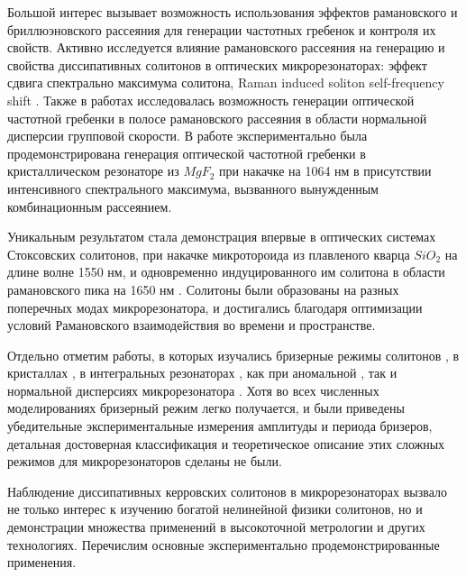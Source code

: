 Большой интерес вызывает возможность использования эффектов рамановского и бриллюэновского рассеяния для генерации частотных гребенок и контроля их свойств. Активно исследуется влияние рамановского рассеяния на генерацию и свойства диссипативных солитонов в оптических микрорезонаторах: эффект сдвига спектрально максимума солитона, Raman induced soliton self-frequency shift \cite{Hansson2014ol,Milian2015,Yi2016,Karpov2016,Bao2017}. Также в работах \cite{Chembo2015,Chembo2016} исследовалась возможность генерации оптической частотной гребенки в полосе рамановского рассеяния в области нормальной дисперсии групповой скорости. В работе \cite{Chembo2015} экспериментально была продемонстрирована генерация оптической частотной гребенки в кристаллическом резонаторе из $MgF_2$ при накачке на 1064 нм в присутствии интенсивного спектрального максимума, вызванного вынужденным комбинационным рассеянием.

Уникальным результатом стала демонстрация впервые в оптических системах Стоксовских солитонов, при накачке микротороида из плавленого кварца $SiO_2$ на длине волне 1550 нм, и одновременно индуцированного им солитона в области рамановского пика на 1650 нм \cite{Yang2016stokes}. Солитоны были образованы на разных поперечных модах микрорезонатора, и достигались благодаря оптимизации условий Рамановского взаимодействия во времени и пространстве.

Отдельно отметим работы, в которых изучались бризерные режимы солитонов \cite{Matsko2012}, в кристаллах \cite{Lucas2017breather}, в интегральных резонаторах \cite{PhysRevLett.117.163901,Yu2017breather}, как при аномальной \cite{Yu2017breather}, так и нормальной дисперсиях микрорезонатора \cite{PhysRevLett.121.257401}. Хотя во всех численных моделированиях бризерный режим легко получается, и были приведены убедительные экспериментальные измерения амплитуды и периода бризеров, детальная достоверная классификация и теоретическое описание этих сложных режимов для микрорезонаторов сделаны не были.

Наблюдение диссипативных керровских солитонов в микрорезонаторах вызвало не только интерес к изучению богатой нелинейной физики солитонов, но и демонстрации множества применений в высокоточной метрологии и других технологиях. Перечислим основные экспериментально продемонстрированные применения.

